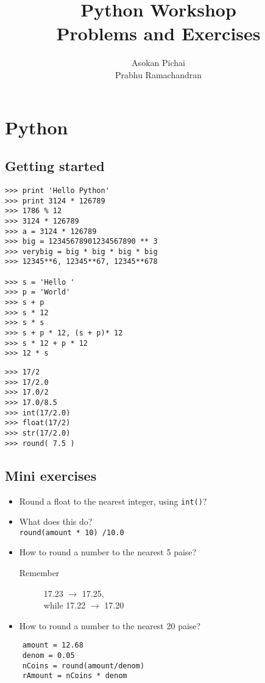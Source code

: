 \documentclass[12pt]{article}
\title{Python Workshop\\Problems and Exercises}
\author{Asokan Pichai\\Prabhu Ramachandran}
\begin{document}
\maketitle

\section{Python}
\subsection{Getting started}
   \begin{verbatim}
>>> print 'Hello Python' 
>>> print 3124 * 126789
>>> 1786 % 12
>>> 3124 * 126789
>>> a = 3124 * 126789
>>> big = 12345678901234567890 ** 3
>>> verybig = big * big * big * big 
>>> 12345**6, 12345**67, 12345**678

>>> s = 'Hello '
>>> p = 'World'
>>> s + p 
>>> s * 12 
>>> s * s
>>> s + p * 12, (s + p)* 12
>>> s * 12 + p * 12
>>> 12 * s 
\end{verbatim}
\newpage

\begin{verbatim}
>>> 17/2
>>> 17/2.0
>>> 17.0/2
>>> 17.0/8.5
>>> int(17/2.0)
>>> float(17/2)
>>> str(17/2.0)
>>> round( 7.5 )
\end{verbatim}
  
\subsection{Mini exercises}
\begin{itemize}
  \item Round a float to the nearest integer, using \texttt{int()}?
  \item What does this do?  \\\texttt{round(amount * 10) /10.0 }
  \item How to round a number to the nearest  5 paise?
    \begin{description}
      \item[Remember] 17.23 $\rightarrow$ 17.25,\\ while 17.22 $\rightarrow$ 17.20
    \end{description}
  \item How to round a number to the nearest 20 paise?
\end{itemize}

\begin{verbatim}
    amount = 12.68
    denom = 0.05
    nCoins = round(amount/denom)
    rAmount = nCoins * denom
\end{verbatim}
\end{document}
